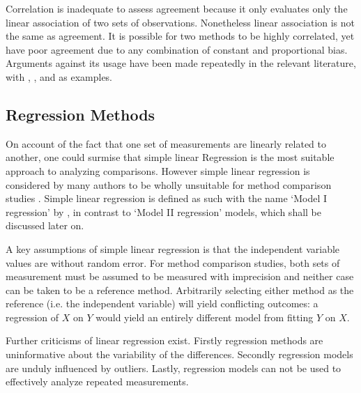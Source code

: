 \documentclass[12pt, a4paper]{report}
\theoremstyle{plain}
\theoremstyle{definition}
\theoremstyle{remark}
\begin{document}
	Correlation is inadequate to assess agreement because it only evaluates only the linear association of two sets of observations.  Nonetheless linear association is not the same as agreement. It is possible for two methods to
	be highly correlated, yet have poor agreement due to any combination of constant and proportional bias. Arguments against its usage have been made repeatedly in the relevant literature,  with \citet{BA83}, \citet{BA86}, \citet{BA2003} and \citet{giavarina2015understanding} as examples.
	
	\subsection*{Regression Methods}
	On account of the fact that one set of measurements are linearly related to another, one could surmise that simple linear Regression is the most suitable approach to analyzing comparisons. However simple linear regression  is considered by many authors to be wholly unsuitable for method comparison studies \citep{BA83,CornCoch,ludbrook97}. Simple linear regression is defined as such with the name `Model I regression' by \citet{CornCoch}, in contrast to `Model II regression' models, which shall be discussed later on.
	
	A key assumptions of simple linear regression is that the independent variable values are without random error. 	
	For method comparison studies, both sets of measurement must be assumed to be measured with imprecision and neither case can be taken to be a reference method. Arbitrarily
	selecting either method as the reference (i.e. the independent variable) will yield conflicting outcomes: a regression of $X$ on $Y$ would yield an entirely different model from fitting $Y$ on $X$.
	
	Further criticisms of linear regression exist.
	Firstly regression methods are uninformative about the variability of the differences. Secondly regression models are unduly influenced by outliers. Lastly, regression models can not be used to effectively analyze repeated measurements.	
	
\end{document}
